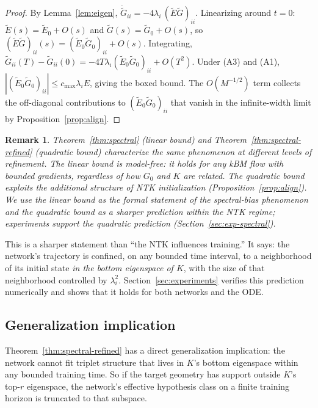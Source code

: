 \documentclass[11pt,letterpaper]{article}
\newtheorem{remark}[theorem]{Remark}
\newcommand{\E}{E}
\newcommand{\Gtilde}{\widetilde{G}}
\newcommand{\Etilde}{\widetilde{\E}}
\begin{document}
\begin{proof}
By Lemma~\ref{lem:eigen}, $\dot{\Gtilde}_{ii}
= -4\lambda_i\,(\Etilde\Gtilde)_{ii}$. Linearizing around $t=0$:
$\Etilde(s) = \Etilde_0 + O(s)$ and $\Gtilde(s) = \Gtilde_0 + O(s)$, so
$(\Etilde\Gtilde)_{ii}(s) = (\Etilde_0 \Gtilde_0)_{ii} + O(s)$.
Integrating,
$\Gtilde_{ii}(T) - \Gtilde_{ii}(0) = -4T\lambda_i(\Etilde_0\Gtilde_0)_{ii}
+ O(T^2)$. Under (A3) and (A1),
$|(\Etilde_0\Gtilde_0)_{ii}| \leq c_{\max}\lambda_i E$, giving the boxed
bound. The $O(M^{-1/2})$ term collects the off-diagonal contributions to
$(\Etilde_0\Gtilde_0)_{ii}$ that vanish in the infinite-width limit by
Proposition~\ref{prop:align}.
\end{proof}

\begin{remark}
Theorem~\ref{thm:spectral} (linear bound) and
Theorem~\ref{thm:spectral-refined} (quadratic bound) characterize the same
phenomenon at different levels of refinement. The linear bound is
\emph{model-free}: it holds for any kBM flow with bounded gradients,
regardless of how $G_0$ and $K$ are related. The quadratic bound exploits
the additional structure of NTK initialization (Proposition~\ref{prop:align}).
We use the linear bound as the formal statement of the spectral-bias
phenomenon and the quadratic bound as a sharper prediction within the
NTK regime; experiments support the quadratic prediction
(Section~\ref{sec:exp-spectral}).
\end{remark}

This is a sharper statement than ``the NTK influences training.'' It says:
the network's trajectory is confined, on any bounded time interval, to a
neighborhood of its initial state \emph{in the bottom eigenspace of $K$},
with the size of that neighborhood controlled by $\lambda_i^2$.
Section~\ref{sec:experiments} verifies this prediction numerically and
shows that it holds for both networks and the ODE.

\subsection{Generalization implication}
\label{sec:gen}

Theorem~\ref{thm:spectral-refined} has a direct generalization
implication: the network cannot fit triplet structure that lives in
$K$'s bottom eigenspace within any bounded training time. So if the
target geometry has support outside $K$'s top-$r$ eigenspace, the
network's effective hypothesis class on a finite training horizon is
truncated to that subspace.
\end{document}
